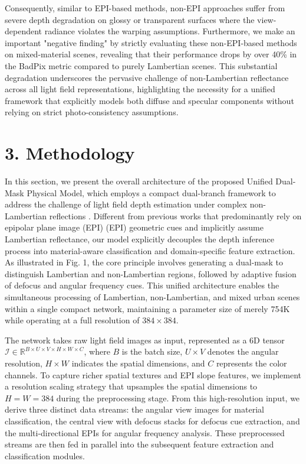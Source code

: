 \documentclass[lettersize,journal]{IEEEtran}
\begin{document}
Consequently, similar to EPI-based methods, non-EPI approaches suffer from severe depth degradation on glossy or transparent surfaces where the view-dependent radiance violates the warping assumptions. Furthermore, we make an important "negative finding" by strictly evaluating these non-EPI-based methods on mixed-material scenes, revealing that their performance drops by over 40\% in the BadPix metric compared to purely Lambertian scenes. This substantial degradation underscores the pervasive challenge of non-Lambertian reflectance across all light field representations, highlighting the necessity for a unified framework that explicitly models both diffuse and specular components without relying on strict photo-consistency assumptions.

\section{3. Methodology}

In this section, we present the overall architecture of the proposed Unified Dual-Mask Physical Model, which employs a compact dual-branch framework to address the challenge of light field depth estimation under complex non-Lambertian reflections \cite{lightlight_31}. Different from previous works that predominantly rely on epipolar plane image (EPI) (EPI) geometric cues and implicitly assume Lambertian reflectance, our model explicitly decouples the depth inference process into material-aware classification and domain-specific feature extraction. As illustrated in Fig. 1, the core principle involves generating a dual-mask to distinguish Lambertian and non-Lambertian regions, followed by adaptive fusion of defocus and angular frequency cues. This unified architecture enables the simultaneous processing of Lambertian, non-Lambertian, and mixed urban scenes within a single compact network, maintaining a parameter size of merely 754K while operating at a full resolution of $384 \times 384$.

The network takes raw light field images as input, represented as a 6D tensor $\mathcal{I} \in \mathbb{R}^{B \times U \times V \times H \times W \times C}$, where $B$ is the batch size, $U \times V$ denotes the angular resolution, $H \times W$ indicates the spatial dimensions, and $C$ represents the color channels. To capture richer spatial textures and EPI slope features, we implement a resolution scaling strategy that upsamples the spatial dimensions to $H=W=384$ during the preprocessing stage. From this high-resolution input, we derive three distinct data streams: the angular view images for material classification, the central view with defocus stacks for defocus cue extraction, and the multi-directional EPIs for angular frequency analysis. These preprocessed streams are then fed in parallel into the subsequent feature extraction and classification modules.
\end{document}
